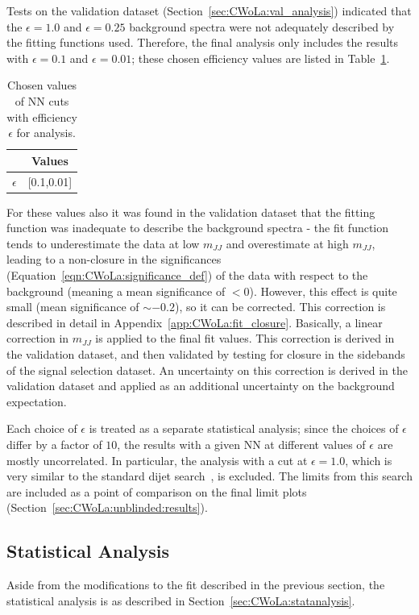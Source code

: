 Tests on the validation dataset (Section~\ref{sec:CWoLa:val_analysis}) indicated that the $\epsilon=1.0$ and $\epsilon=0.25$ background spectra were not adequately described by the fitting functions used.
Therefore, the final analysis only includes the results with $\epsilon=0.1$ and $\epsilon=0.01$; these chosen efficiency values are listed in Table~\ref{tab:effs_final}.
\begin{table}[htb]
  \centering
  \caption{Chosen values of NN cuts with efficiency $\epsilon$ for analysis.}
  \label{tab:effs_final}
  \begin{tabular}{c c}
    \hline
 & Values   \\ \hline
$\epsilon$ & [0.1,0.01] \\
    \hline
  \end{tabular}
\end{table}
For these values also it was found in the validation dataset that the fitting function was inadequate to describe the background spectra - the fit function tends to underestimate the data at low $m_{JJ}$ and overestimate at high $m_{JJ}$, leading to a non-closure in the significances (Equation~\ref{eqn:CWoLa:significance_def}) of the data with respect to the background (meaning a mean significance of $<0$).
However, this effect is quite small (mean significance of $\sim -0.2$), so it can be corrected.
This correction is described in detail in Appendix~\ref{app:CWoLa:fit_closure}.
Basically, a linear correction in $m_{JJ}$ is applied to the final fit values.
This correction is derived in the validation dataset, and then validated by testing for closure in the sidebands of the signal selection dataset.
An uncertainty on this correction is derived in the validation dataset and applied as an additional uncertainty on the background expectation.

Each choice of $\epsilon$ is treated as a separate statistical analysis; since the choices of $\epsilon$ differ by a factor of $10$, the results with a given NN at different values of $\epsilon$ are mostly uncorrelated.
In particular, the analysis with a cut at $\epsilon=1.0$, which is very similar to the standard dijet search~\cite{ATLAS:2015nsi}, is excluded.
The limits from this search are included as a point of comparison on the final limit plots (Section~\ref{sec:CWoLa:unblinded:results}).

\subsection{Statistical Analysis}
\label{sec:CWoLa:unblinded:statanalysis}
Aside from the modifications to the fit described in the previous section, the statistical analysis is as described in Section~\ref{sec:CWoLa:statanalysis}.

